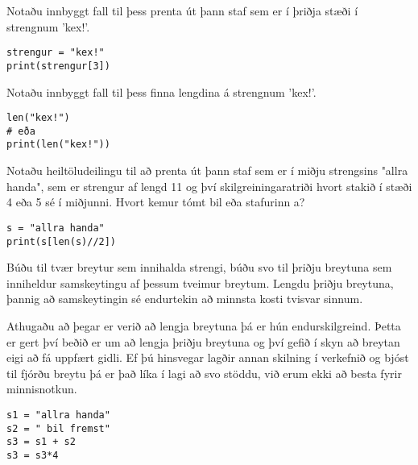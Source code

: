 \begin{exercise}\label{str4}
	Notaðu innbyggt fall til þess prenta út þann staf sem er í þriðja stæði í strengnum 'kex!'.
\end{exercise}
\begin{Answer}[ref={str4}]
\begin{lstlisting}
strengur = "kex!"
print(strengur[3])\end{lstlisting}
\end{Answer}

\begin{exercise}\label{str4-5}
	Notaðu innbyggt fall til þess finna lengdina á strengnum 'kex!'.
\end{exercise}
\begin{Answer}[ref={str4-5}]
\begin{lstlisting}
len("kex!")
# eða
print(len("kex!"))\end{lstlisting}
\end{Answer}

\begin{exercise}\label{str5}
	Notaðu heiltöludeilingu til að prenta út þann staf sem er í miðju strengsins "allra handa", sem er strengur af lengd 11 og því skilgreiningaratriði hvort stakið í stæði 4 eða 5 sé í miðjunni.
	Hvort kemur tómt bil eða stafurinn a?
\end{exercise}
\begin{Answer}[ref={str5}]
\begin{lstlisting}
s = "allra handa"
print(s[len(s)//2])\end{lstlisting}
\end{Answer}

\begin{exercise}\label{str6}
	Búðu til tvær breytur sem innihalda strengi, búðu svo til þriðju breytuna sem inniheldur samskeytingu af þessum tveimur breytum.
	Lengdu þriðju breytuna, þannig að samskeytingin sé endurtekin að minnsta kosti tvisvar sinnum.
\end{exercise}
\begin{Answer}[ref={str6}]
	Athugaðu að þegar er verið að lengja breytuna þá er hún endurskilgreind.
	Þetta er gert því beðið er um að lengja þriðju breytuna og því gefið í skyn að breytan eigi að fá uppfært gidli.
	Ef þú hinsvegar lagðir annan skilning í verkefnið og bjóst til fjórðu breytu þá er það líka í lagi að svo stöddu, við erum ekki að besta fyrir minnisnotkun.
\begin{lstlisting}
s1 = "allra handa"
s2 = " bil fremst"
s3 = s1 + s2
s3 = s3*4\end{lstlisting}
\end{Answer}

